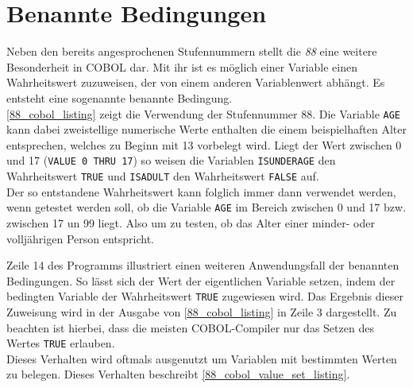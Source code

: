 \section{Benannte Bedingungen}
Neben den bereits angesprochenen Stufennummern stellt die \textit{88} eine weitere Besonderheit in COBOL dar. Mit ihr ist es möglich einer Variable einen Wahrheitswert zuzuweisen, der von einem anderen Variablenwert abhängt. Es entsteht eine sogenannte benannte Bedingung.\\

\autoref{88_cobol_listing} zeigt die Verwendung der Stufennummer 88. Die Variable \texttt{AGE} kann dabei zweistellige numerische Werte enthalten die einem beispielhaften Alter entsprechen, welches zu Beginn mit 13 vorbelegt wird. Liegt der Wert zwischen 0 und 17 (\texttt{VALUE 0 THRU 17}) so weisen die Variablen \texttt{ISUNDERAGE} den Wahrheitswert \texttt{TRUE} und \texttt{ISADULT} den Wahrheitswert \texttt{FALSE} auf.\\

Der so entstandene Wahrheitswert kann folglich immer dann verwendet werden, wenn getestet werden soll, ob die Variable \texttt{AGE} im Bereich zwischen 0 und 17 bzw. zwischen 17 un 99 liegt. Also um zu testen, ob das Alter einer minder- oder volljährigen Person entspricht.\\


Zeile 14 des Programms illustriert einen weiteren Anwendungsfall der benannten Bedingungen. So lässt sich der Wert der eigentlichen Variable setzen, indem der bedingten Variable der Wahrheitswert \texttt{TRUE} zugewiesen wird. Das Ergebnis dieser Zuweisung wird in der Ausgabe von \autoref{88_cobol_listing} in Zeile 3 dargestellt. Zu beachten ist hierbei, dass die meisten COBOL-Compiler nur das Setzen des Wertes \texttt{TRUE} erlauben.\\

Dieses Verhalten wird oftmals ausgenutzt um Variablen mit bestimmten Werten zu belegen. Dieses Verhalten beschreibt \autoref{88_cobol_value_set_listing}.\\


